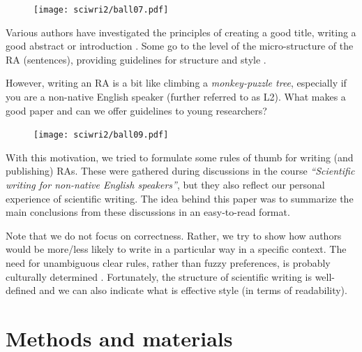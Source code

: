 \documentclass[graybox,envcountchap,sectrefs,UStrade]{svmono}
\begin{document}
\begin{figure}
\vspace{-20pt}
\texttt{[image: sciwri2/ball07.pdf]}
\vspace{-20pt}
\end{figure}
Various authors have investigated the principles of creating a good title, writing a good abstract or introduction \citep{McPhee2001,swales2004academic}. Some go to the level of the micro-structure of the RA (sentences), providing guidelines for structure and style \citep{Gopen1990,turk1989effective,Kirkman2004S}.\par

However, writing an RA is a bit like climbing a \emph{monkey-puzzle tree}, especially if you are a non-native English speaker (further referred to as L2).  What makes a good paper and can we offer guidelines to young researchers?\par

\begin{figure}
\vspace{-20pt}
\texttt{[image: sciwri2/ball09.pdf]}
\vspace{-20pt}
\end{figure}
With this motivation, we tried to formulate some rules of thumb for writing (and publishing) RAs. These were gathered during discussions in the course \emph{``Scientific writing for non-native English speakers''}, but they also reflect our personal experience of scientific writing. 
The idea behind this paper was to summarize the main conclusions from these discussions in an easy-to-read format. \par

Note that we do not focus on correctness. Rather, we try to show how authors would be more/less likely to write in a particular way in a specific context. The need for unambiguous clear rules, rather than fuzzy preferences, is probably culturally determined \citep{hofstede2005cultures}. Fortunately, the structure of scientific writing is well-defined and we can also indicate what is effective style (in terms of readability).\par


\section*{Methods and materials}
\end{document}
